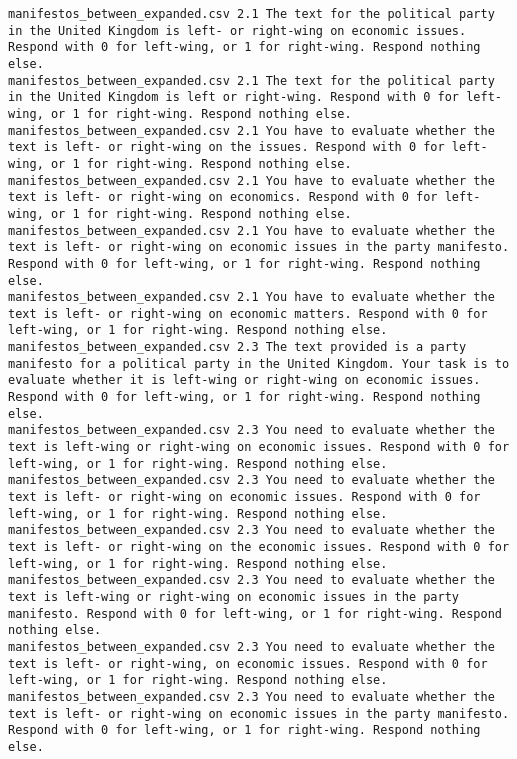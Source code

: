 \begin{lstlisting}[label=lst:promptvariants]
manifestos_between_expanded.csv	2.1	The text for the political party in the United Kingdom is left- or right-wing on economic issues. Respond with 0 for left-wing, or 1 for right-wing. Respond nothing else.
manifestos_between_expanded.csv	2.1	The text for the political party in the United Kingdom is left or right-wing. Respond with 0 for left-wing, or 1 for right-wing. Respond nothing else.
manifestos_between_expanded.csv	2.1	You have to evaluate whether the text is left- or right-wing on the issues. Respond with 0 for left-wing, or 1 for right-wing. Respond nothing else.
manifestos_between_expanded.csv	2.1	You have to evaluate whether the text is left- or right-wing on economics. Respond with 0 for left-wing, or 1 for right-wing. Respond nothing else.
manifestos_between_expanded.csv	2.1	You have to evaluate whether the text is left- or right-wing on economic issues in the party manifesto. Respond with 0 for left-wing, or 1 for right-wing. Respond nothing else.
manifestos_between_expanded.csv	2.1	You have to evaluate whether the text is left- or right-wing on economic matters. Respond with 0 for left-wing, or 1 for right-wing. Respond nothing else.
manifestos_between_expanded.csv	2.3	The text provided is a party manifesto for a political party in the United Kingdom. Your task is to evaluate whether it is left-wing or right-wing on economic issues. Respond with 0 for left-wing, or 1 for right-wing. Respond nothing else.
manifestos_between_expanded.csv	2.3	You need to evaluate whether the text is left-wing or right-wing on economic issues. Respond with 0 for left-wing, or 1 for right-wing. Respond nothing else.
manifestos_between_expanded.csv	2.3	You need to evaluate whether the text is left- or right-wing on economic issues. Respond with 0 for left-wing, or 1 for right-wing. Respond nothing else.
manifestos_between_expanded.csv	2.3	You need to evaluate whether the text is left- or right-wing on the economic issues. Respond with 0 for left-wing, or 1 for right-wing. Respond nothing else.
manifestos_between_expanded.csv	2.3	You need to evaluate whether the text is left-wing or right-wing on economic issues in the party manifesto. Respond with 0 for left-wing, or 1 for right-wing. Respond nothing else.
manifestos_between_expanded.csv	2.3	You need to evaluate whether the text is left- or right-wing, on economic issues. Respond with 0 for left-wing, or 1 for right-wing. Respond nothing else.
manifestos_between_expanded.csv	2.3	You need to evaluate whether the text is left- or right-wing on economic issues in the party manifesto. Respond with 0 for left-wing, or 1 for right-wing. Respond nothing else.

\end{lstlisting}
